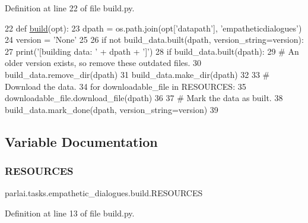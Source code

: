 Definition at line 22 of file build.\+py.


\begin{DoxyCode}
22 \textcolor{keyword}{def }\hyperlink{namespacedialog__babi__feedback_1_1build_a7a9d289f7493a5ded13c4b7f071b6184}{build}(opt):
23     dpath = os.path.join(opt[\textcolor{stringliteral}{'datapath'}], \textcolor{stringliteral}{'empatheticdialogues'})
24     version = \textcolor{stringliteral}{'None'}
25 
26     \textcolor{keywordflow}{if} \textcolor{keywordflow}{not} build\_data.built(dpath, version\_string=version):
27         print(\textcolor{stringliteral}{'[building data: '} + dpath + \textcolor{stringliteral}{']'})
28         \textcolor{keywordflow}{if} build\_data.built(dpath):
29             \textcolor{comment}{# An older version exists, so remove these outdated files.}
30             build\_data.remove\_dir(dpath)
31         build\_data.make\_dir(dpath)
32 
33         \textcolor{comment}{# Download the data.}
34         \textcolor{keywordflow}{for} downloadable\_file \textcolor{keywordflow}{in} RESOURCES:
35             downloadable\_file.download\_file(dpath)
36 
37         \textcolor{comment}{# Mark the data as built.}
38         build\_data.mark\_done(dpath, version\_string=version)
39 \end{DoxyCode}


\subsection{Variable Documentation}
\mbox{\label{namespaceparlai_1_1tasks_1_1empathetic__dialogues_1_1build_a29aee0609ee33d7b70477abd2862688d}} 
\subsubsection{\texorpdfstring{R\+E\+S\+O\+U\+R\+C\+ES}{RESOURCES}}
{\footnotesize\ttfamily parlai.\+tasks.\+empathetic\+\_\+dialogues.\+build.\+R\+E\+S\+O\+U\+R\+C\+ES}



Definition at line 13 of file build.\+py.

